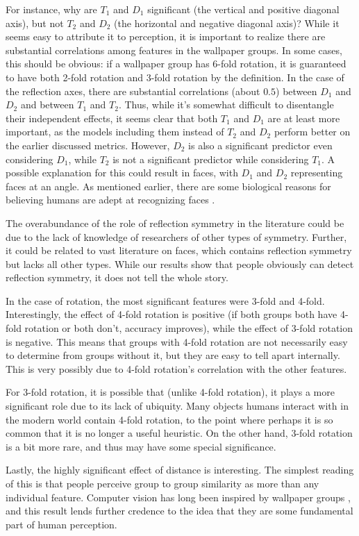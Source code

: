 For instance, why are $T_1$ and $D_1$ significant (the vertical and positive diagonal axis), but not $T_2$ and $D_2$ (the horizontal and negative diagonal axis)? While it seems easy to attribute it to perception, it is important to realize there are substantial correlations among features in the wallpaper groups. In some cases, this should be obvious: if a wallpaper group has 6-fold rotation, it is guaranteed to have both 2-fold rotation and 3-fold rotation by the definition. In the case of the reflection axes, there are substantial correlations (about $0.5$) between $D_1$ and $D_2$ and between $T_1$ and $T_2$. Thus, while it's somewhat difficult to disentangle their independent effects, it seems clear that both $T_1$ and $D_1$ are at least more important, as the models including them instead of $T_2$ and $D_2$ perform better on the earlier discussed metrics. However, $D_2$ is also a significant predictor even considering $D_1$, while $T_2$ is not a significant predictor while considering $T_1$. A possible explanation for this could result in faces, with $D_1$ and $D_2$ representing faces at an angle. As mentioned earlier, there are some biological reasons for believing humans are adept at recognizing faces \cite{ffa}.     

The overabundance of the role of reflection symmetry in the literature could be due to the lack of knowledge of researchers of other types of symmetry. Further, it could be related to vast literature on faces, which contains reflection symmetry but lacks all other types. While our results show that people obviously can detect reflection symmetry, it does not tell the whole story.

In the case of rotation, the most significant features were 3-fold and 4-fold. Interestingly, the effect of 4-fold rotation is positive (if both groups both have 4-fold rotation or both don't, accuracy improves), while the effect of 3-fold rotation is negative. This means that groups with 4-fold rotation are not necessarily easy to determine from groups without it, but they are easy to tell apart internally. This is very possibly due to 4-fold rotation's correlation with the other features.

For 3-fold rotation, it is possible that (unlike 4-fold rotation), it plays a more significant role due to its lack of ubiquity. Many objects humans interact with in the modern world contain 4-fold rotation, to the point where perhaps it is so common that it is no longer a useful heuristic. On the other hand, 3-fold rotation is a bit more rare, and thus may have some special significance.

Lastly, the highly significant effect of distance is interesting. The simplest reading of this is that people perceive group to group similarity as more than any individual feature. Computer vision has long been inspired by wallpaper groups \citep{yanxi1,yanxi2}, and this result lends further credence to the idea that they are some fundamental part of human perception.